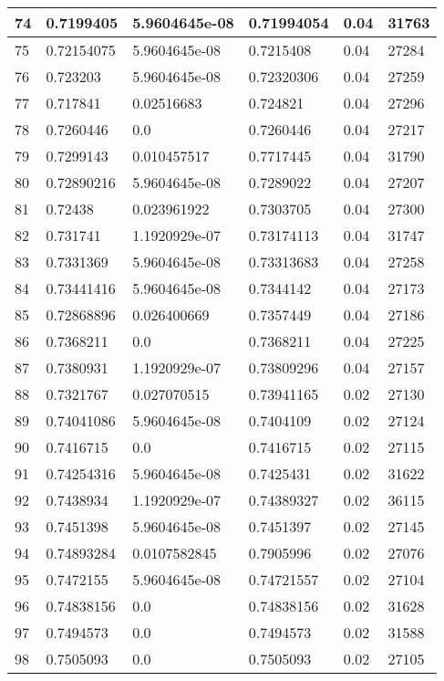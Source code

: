 \begin{longtable}{|l|l|l|l|l|l|}
74 & 0.7199405 & 5.9604645e-08 & 0.71994054 & 0.04 & 31763 \\ \hline 
75 & 0.72154075 & 5.9604645e-08 & 0.7215408 & 0.04 & 27284 \\ \hline 
76 & 0.723203 & 5.9604645e-08 & 0.72320306 & 0.04 & 27259 \\ \hline 
77 & 0.717841 & 0.02516683 & 0.724821 & 0.04 & 27296 \\ \hline 
78 & 0.7260446 & 0.0 & 0.7260446 & 0.04 & 27217 \\ \hline 
79 & 0.7299143 & 0.010457517 & 0.7717445 & 0.04 & 31790 \\ \hline 
80 & 0.72890216 & 5.9604645e-08 & 0.7289022 & 0.04 & 27207 \\ \hline 
81 & 0.72438 & 0.023961922 & 0.7303705 & 0.04 & 27300 \\ \hline 
82 & 0.731741 & 1.1920929e-07 & 0.73174113 & 0.04 & 31747 \\ \hline 
83 & 0.7331369 & 5.9604645e-08 & 0.73313683 & 0.04 & 27258 \\ \hline 
84 & 0.73441416 & 5.9604645e-08 & 0.7344142 & 0.04 & 27173 \\ \hline 
85 & 0.72868896 & 0.026400669 & 0.7357449 & 0.04 & 27186 \\ \hline 
86 & 0.7368211 & 0.0 & 0.7368211 & 0.04 & 27225 \\ \hline 
87 & 0.7380931 & 1.1920929e-07 & 0.73809296 & 0.04 & 27157 \\ \hline 
88 & 0.7321767 & 0.027070515 & 0.73941165 & 0.02 & 27130 \\ \hline 
89 & 0.74041086 & 5.9604645e-08 & 0.7404109 & 0.02 & 27124 \\ \hline 
90 & 0.7416715 & 0.0 & 0.7416715 & 0.02 & 27115 \\ \hline 
91 & 0.74254316 & 5.9604645e-08 & 0.7425431 & 0.02 & 31622 \\ \hline 
92 & 0.7438934 & 1.1920929e-07 & 0.74389327 & 0.02 & 36115 \\ \hline 
93 & 0.7451398 & 5.9604645e-08 & 0.7451397 & 0.02 & 27145 \\ \hline 
94 & 0.74893284 & 0.0107582845 & 0.7905996 & 0.02 & 27076 \\ \hline 
95 & 0.7472155 & 5.9604645e-08 & 0.74721557 & 0.02 & 27104 \\ \hline 
96 & 0.74838156 & 0.0 & 0.74838156 & 0.02 & 31628 \\ \hline 
97 & 0.7494573 & 0.0 & 0.7494573 & 0.02 & 31588 \\ \hline 
98 & 0.7505093 & 0.0 & 0.7505093 & 0.02 & 27105 \\ \hline 

\end{longtable}
